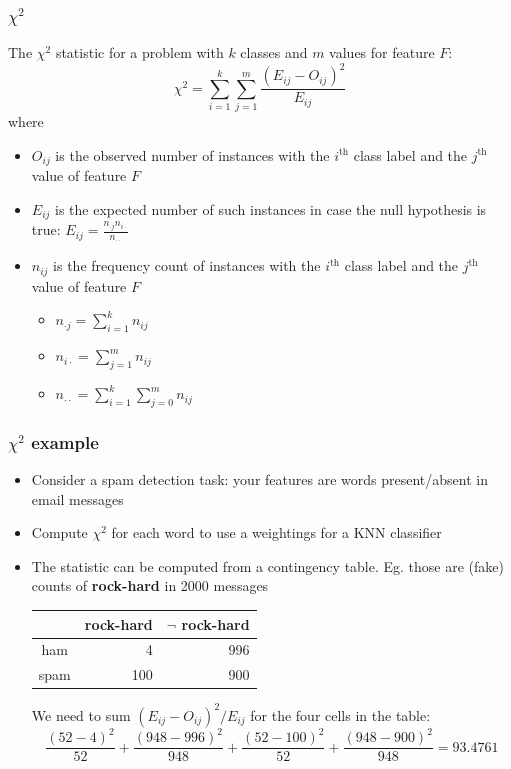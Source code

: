 \documentclass{beamer}
\begin{document}
\begin{frame}
 \frametitle{$\chi^2$}
\begin{block}{}
  The $\chi^2$ statistic for a problem with $k$ classes and $m$ values
  for feature $F$:
\begin{equation}
 \chi^2 = \sum_{i=1}^k \sum_{j=1}^m \frac{(E_{ij}-O_{ij})^2}{E_{ij}}
\end{equation}
\vskip -0.5cm 
where 
\begin{itemize}
\item $O_{ij}$ is the observed number of instances with the
  $i^{\text{th}}$ class label and the $j^{\text{th}}$ value of feature
  $F$
\item $E_{ij}$ is the expected number of such instances in case the
  null hypothesis is true: $ E_{ij} = \frac{n_{\cdot
      j}n_{i\cdot}}{n_{\cdot\cdot}} $
\item $n_{ij}$ is the frequency count of instances with the
  $i^{\text{th}}$ class label and the $j^{\text{th}}$ value of feature
  $F$
\begin{itemize}
\item $n_{\cdot j} = \sum_{i=1}^k n_{ij}$
\item $n_{i\cdot } = \sum_{j=1}^m n_{ij}$
\item $n_{\cdot \cdot} = \sum_{i=1}^k \sum_{j=0}^m n_{ij}$
\end{itemize}
\end{itemize}
\end{block}
\end{frame}

\begin{frame}
 \frametitle{$\chi^2$ example}
\begin{itemize}
\item Consider a spam detection task: your features are words
  present/absent in email messages
\item Compute $\chi^2$ for each word to use a weightings for a KNN
  classifier
\item The statistic can be computed from a contingency
  table. Eg. those are (fake) counts of \textbf{rock-hard} in 2000
  messages

\begin{center}
\begin{tabular}{c|r|r}
         & rock-hard  & $\neg$ rock-hard\\\hline
ham      &  4         & 996         \\\hline
spam     &  100       & 900         
\end{tabular}
\end{center}

We need to sum $(E_{ij}-O_{ij})^2/E_{ij}$ for the four cells in the table:
\[
 \frac{(52 - 4)^2}{52} + \frac{(948 - 996)^2}{948} + \frac{(52 - 100)^2}{52} + \frac{(948 - 900)^2}{948} = 93.4761
\]

\end{itemize}
\end{frame}
\end{document}
